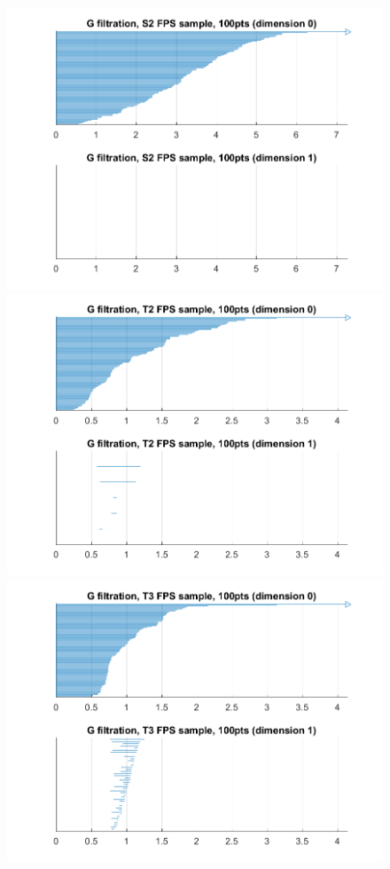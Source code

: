 \documentclass[a4paper,12pt,reqno, english]{amsart}
\theoremstyle{plain}
\theoremstyle{definition}
\begin{document}
{{\begin{figure}
\includegraphics[scale= 0.7]{GFiltS2FPS100pts.png}
\includegraphics[scale= 0.7]{GFiltT2FPS100pts.png}
\includegraphics[scale= 0.7]{GFiltT3FPS100pts.png}

\end{figure}}}
\end{document}
